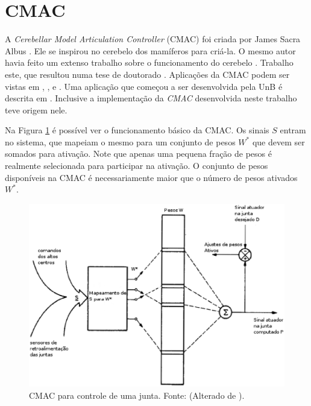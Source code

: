 
\goodbreak
\newpage
\clearpage

\section[CMAC]{CMAC}
\label{cmac_sec}

A \emph{Cerebellar Model Articulation Controller} (CMAC) foi criada por James Sacra Albus \cite{Albus1975b}. 
Ele se inspirou no cerebelo dos mamíferos para criá-la. 
O mesmo autor havia feito um extenso trabalho sobre o funcionamento do cerebelo \cite{Albus1971b}.
Trabalho este, que resultou numa tese de doutorado \cite{Albus1972a}.
Aplicações da CMAC podem ser vistas em \cite{Albus1975d}, \cite{Albus1979}, \cite{Sabourin2006a} e \cite{Lin2002a}.
Uma aplicação que começou a ser desenvolvida pela UnB é descrita em . Inclusive a implementação da \emph{CMAC} desenvolvida neste trabalho teve origem nele.

Na Figura \ref{fig1} é possível ver o funcionamento básico da CMAC. Os sinais $S$ entram no sistema, que mapeiam o mesmo para um conjunto de pesos $W^*$ que devem ser somados para ativação. 
Note que apenas uma pequena fração de pesos é realmente selecionada para participar na ativação. 
O conjunto de pesos disponíveis na CMAC é necessariamente maior que o número de pesos ativados $W^*$. 

\begin{figure}[H]
	\centering
	\includegraphics[width=15 cm]{figuras/cmac1.eps}
	\caption{CMAC para controle de uma junta. Fonte: (Alterado de ).}
    	\label{fig1}
\end{figure}


